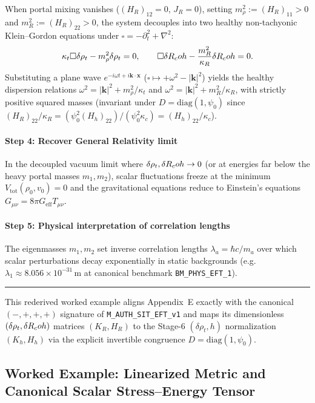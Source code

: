 When portal mixing vanishes ($(H_R)_{12} = 0$, $J_R = 0$), setting $m_\rho^2 := (H_R)_{11} > 0$ and $m_R^2 := (H_R)_{22} > 0$, the system decouples into two healthy non-tachyonic Klein--Gordon equations under $\square = -\partial_t^2 + \nabla^2$:
\[
\kappa_t \square \delta \rho_t - m_{\rho}^2 \delta \rho_t = 0,
\qquad
\square \delta R_coh - \frac{m_{R}^2}{\kappa_R} \delta R_coh = 0.
\]
Substituting a plane wave $e^{-i\omega t + i\mathbf{k}\cdot\mathbf{x}}$ ($\square \mapsto +\omega^2 - |\mathbf{k}|^2$) yields the healthy dispersion relations $\omega^2 = |\mathbf{k}|^2 + m_\rho^2/\kappa_t$ and $\omega^2 = |\mathbf{k}|^2 + m_R^2/\kappa_R$, with strictly positive squared masses (invariant under $D = \mathrm{diag}(1, \psi_0)$ since $(H_R)_{22}/\kappa_R = (\psi_0^2 (H_h)_{22})/(\psi_0^2 \kappa_c) = (H_h)_{22}/\kappa_c$).

\paragraph{Step 4: Recover General Relativity limit}

In the decoupled vacuum limit where $\delta\rho_t, \delta R_coh \to 0$ (or at energies far below the heavy portal masses $m_1, m_2$), scalar fluctuations freeze at the minimum $V_{\mathrm{tot}}(\rho_0, v_0) = 0$ and the gravitational equations reduce to Einstein's equations $G_{\mu\nu} = 8\pi G_{\mathrm{eff}} T_{\mu\nu}$.

\paragraph{Step 5: Physical interpretation of correlation lengths}

The eigenmasses $m_1, m_2$ set inverse correlation lengths $\lambda_a = \hbar c / m_a$ over which scalar perturbations decay exponentially in static backgrounds (e.g.\ $\lambda_1 \approx 8.056\times 10^{-31}\,\mathrm{m}$ at canonical benchmark \texttt{BM\_PHYS\_EFT\_1}).

\medskip\hrule\medskip
This rederived worked example aligns Appendix~E exactly with the canonical $(-,+,+,+)$ signature of \texttt{M\_AUTH\_SIT\_EFT\_v1} and maps its dimensionless $(\delta\rho_t, \delta R_coh)$ matrices $(K_R, H_R)$ to the Stage-6 $(\delta\rho_t, h)$ normalization $(K_h, H_h)$ via the explicit invertible congruence $D = \mathrm{diag}(1, \psi_0)$.

\subsection{Worked Example: Linearized Metric and Canonical Scalar Stress--Energy Tensor}

